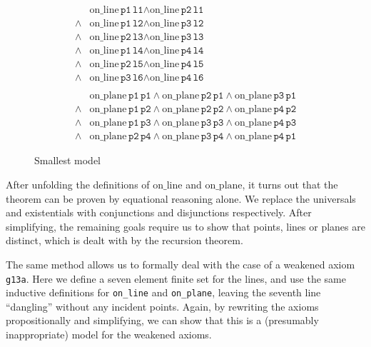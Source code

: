 \documentclass{article}
\newcommand{\online}[2]{\text{on\_line}\,#1\,#2}
\newcommand{\onplane}[2]{\text{on\_plane}\,#1\,#2}
\begin{document}
\begin{figure}
\begin{minipage}[c]{5cm}
\begin{align*}
& \online{\texttt{p1}}\texttt{l1}\wedge \online{\texttt{p2}}\texttt{l1}\\
\wedge & \online{\texttt{p1}}\texttt{l2}\wedge \online{\texttt{p3}}\texttt{l2}\\
\wedge & \online{\texttt{p2}}\texttt{l3}\wedge \online{\texttt{p3}}\texttt{l3}\\
\wedge & \online{\texttt{p1}}\texttt{l4}\wedge \online{\texttt{p4}}\texttt{l4}\\
\wedge & \online{\texttt{p2}}\texttt{l5}\wedge \online{\texttt{p4}}\texttt{l5}\\
\wedge & \online{\texttt{p3}}\texttt{l6}\wedge \online{\texttt{p4}}\texttt{l6}\\
\\
& \onplane{\texttt{p1}}{\texttt{p1}}\wedge \onplane{\texttt{p2}}{\texttt{p1}}\wedge \onplane{\texttt{p3}}{\texttt{p1}}\\
\wedge & \onplane{\texttt{p1}}{\texttt{p2}}\wedge \onplane{\texttt{p2}}{\texttt{p2}}\wedge \onplane{\texttt{p4}}{\texttt{p2}}\\
\wedge & \onplane{\texttt{p1}}{\texttt{p3}}\wedge \onplane{\texttt{p3}}{\texttt{p3}}\wedge \onplane{\texttt{p4}}{\texttt{p3}}\\
\wedge & \onplane{\texttt{p2}}{\texttt{p4}}\wedge \onplane{\texttt{p3}}{\texttt{p4}}\wedge \onplane{\texttt{p4}}{\texttt{p1}}
\end{align*}\end{minipage}
\caption{Smallest model}\label{fig:SmallestModel}
\end{figure}

After unfolding the definitions of $\text{on\_line}$ and $\text{on\_plane}$, it turns out that the theorem can be proven by equational reasoning alone. We replace the universals and existentials with conjunctions and disjunctions respectively. After simplifying, the remaining goals require us to show that points, lines or planes are distinct, which is dealt with by the recursion theorem.

The same method allows us to formally deal with the case of a weakened axiom \texttt{g13a}. Here we define a seven element finite set for the lines, and use the same inductive definitions for \texttt{on\_line} and \texttt{on\_plane}, leaving the seventh line ``dangling'' without any incident points. Again, by rewriting the axioms propositionally and simplifying, we can show that this is a (presumably inappropriate) model for the weakened axioms.
\end{document}
